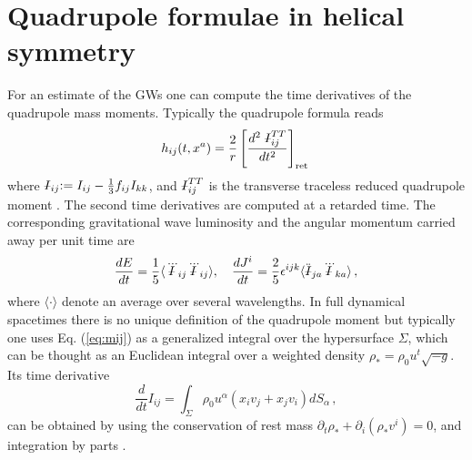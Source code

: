 \documentclass[twocolumn,superscriptaddress,showpacs,prd,aps,amsmath,amssymb,nofootinbib]{revtex4-1}
\newcommand{\GA}{\alpha}
\newcommand{\GE}{\epsilon}
\newcommand{\GR}{\rho}
\newcommand{\pd}{\partial}
\newcommand{\be}{\begin{equation}}
\newcommand{\ee}{\end{equation}}
\def\qeq{\mathrel{%
    \mathchoice{\QEQ}{\QEQ}{\scriptsize\QEQ}{\tiny\QEQ}%
}}
\def\QEQ{{%
    \setbox0\hbox{$I$}%
    \rlap{\hbox to \wd0{\hss--\hss}}\box0
}}
\begin{document}
\appendix

\section{Quadrupole formulae in helical symmetry}
\label{sec:quad}

For an estimate of the GWs one can  compute the time 
derivatives of the quadrupole mass moments. Typically the quadrupole formula  reads
\be
h_{ij}(t,x^a) = \frac{2}{r} \left[ \frac{d^2 \qeq_{ij}^{TT}}{dt^2} \right]_{\rm ret} \,
\label{eq:hq}
\ee
where  $\qeq_{ij} := I_{ij}-\frac{1}{3}f_{ij}I_{kk}$, and  $\qeq_{ij}^{TT}$ 
is the transverse traceless reduced quadrupole moment \cite{MTW}. 
The second time derivatives 
are computed at a retarded time. The corresponding gravitational wave luminosity and the angular momentum
carried away per unit time are 
\be
\frac{dE}{dt}=\frac{1}{5} \langle \dddot{\qeq}_{ij}\dddot{\qeq}_{ij} \rangle , \quad
\frac{dJ^i}{dt}=\frac{2}{5} \GE^{ijk} \langle \ddot{\qeq}_{ja}\dddot{\qeq}_{ka} \rangle \, , 
\label{eq:qej}
\ee
where $\langle\cdot\rangle$ denote an average over several wavelengths.
In full dynamical spacetimes there is no unique definition of the quadrupole moment but 
typically one uses Eq. (\ref{eq:mij}) as a generalized integral over the hypersurface $\Sigma$, \cite{SS03}
which can be thought as an Euclidean integral over a weighted density 
$\GR_\ast=\GR_0 u^t \sqrt{-g}$. Its time derivative
\be
\frac{d}{dt} I_{ij} = \int_\Sigma \GR_0 u^\GA (x_i v_j + x_j v_i) dS_\GA \, ,
\ee
can be obtained by using the conservation of rest mass $\pd_t \GR_\ast+\pd_i(\GR_\ast v^i)=0$, 
and integration by parts \cite{FE90}. 
\end{document}
